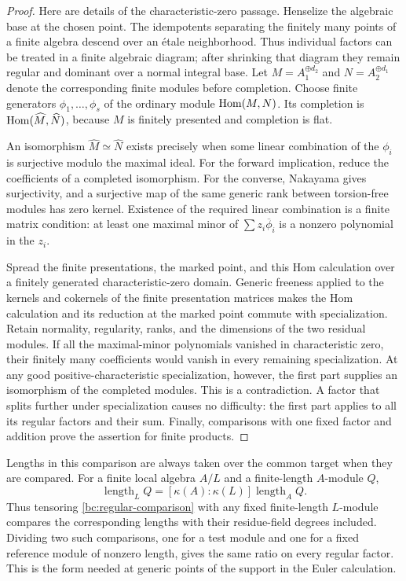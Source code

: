 \begin{proof}
Here are details of the characteristic-zero passage.  Henselize the
algebraic base at the chosen point.  The idempotents separating the
finitely many points of a finite algebra descend over an \'{e}tale
neighborhood.  Thus individual factors can be treated in a finite
algebraic diagram; after shrinking that diagram they remain regular and
dominant over a normal integral base.  Let $M=A_1^{\oplus d_2}$ and
$N=A_2^{\oplus d_1}$ denote the corresponding finite modules before
completion.  Choose finite generators $\phi_1,\ldots,\phi_s$ of the
ordinary module $\operatorname{Hom}(M,N)$.  Its completion is
$\operatorname{Hom}(\widehat M,\widehat N)$, because $M$ is finitely presented and
completion is flat.

An isomorphism $\widehat M\simeq\widehat N$ exists precisely when some
linear combination of the $\phi_i$ is surjective modulo the maximal
ideal.  For the forward implication, reduce the coefficients of a
completed isomorphism.  For the converse, Nakayama gives surjectivity,
and a surjective map of the same generic rank between torsion-free
modules has zero kernel.  Existence of the required linear combination
is a finite matrix condition: at least one maximal minor of
$\sum z_i\overline\phi_i$ is a nonzero polynomial in the $z_i$.

Spread the finite presentations, the marked point, and this Hom
calculation over a finitely generated characteristic-zero domain.
Generic freeness applied to the kernels and cokernels of the finite
presentation matrices makes the Hom calculation and its reduction at
the marked point commute with specialization.  Retain normality,
regularity, ranks, and the dimensions of the two residual modules.
If all the maximal-minor polynomials vanished in characteristic zero,
their finitely many coefficients would vanish in every remaining
specialization.  At any good positive-characteristic specialization,
however, the first part supplies an isomorphism of the completed
modules.  This is a contradiction.  A factor that splits further under
specialization causes no difficulty: the first part applies to all its
regular factors and their sum.  Finally, comparisons with one fixed
factor and addition prove the assertion for finite products.
\end{proof}

\begin{remark}\label{bc:residue-degrees}
Lengths in this comparison are always taken over the common target when they
are compared.  For a finite local algebra $A/L$ and a finite-length
$A$-module $Q$,
\[
 \operatorname{length}_L Q
   =[\kappa(A):\kappa(L)]\operatorname{length}_A Q.
\]
Thus tensoring \eqref{bc:regular-comparison} with any fixed finite-length
$L$-module compares the corresponding lengths with their residue-field
degrees included.  Dividing two such comparisons, one for a test module
and one for a fixed reference module of nonzero length, gives the same
ratio on every regular factor.  This is the form needed at generic
points of the support in the Euler calculation.
\end{remark}

